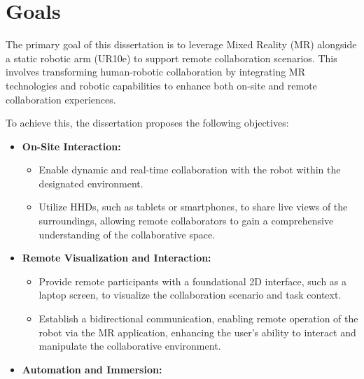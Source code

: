 \section{Goals}
\label{section:Goals}
% 
The primary goal of this dissertation is to leverage Mixed Reality (\ac{MR}) alongside a static robotic arm (UR10e) to support remote collaboration scenarios. 
This involves transforming human-robotic collaboration by integrating \ac{MR} technologies and robotic capabilities to enhance both on-site and 
remote collaboration experiences.

To achieve this, the dissertation proposes the following objectives:

\begin{itemize}
    \item \textbf{On-Site Interaction:}
    \begin{itemize}
        \item Enable dynamic and real-time collaboration with the robot within the designated environment.
        \item Utilize \ac{HHDs}, such as tablets or smartphones, to share live views of the surroundings, allowing remote collaborators 
        to gain a comprehensive understanding of the collaborative space.
    \end{itemize}
    \item \textbf{Remote Visualization and Interaction:}
    \begin{itemize}
        \item Provide remote participants with a foundational 2D interface, such as a laptop screen, to visualize the collaboration scenario and 
        task context.
        \item Establish a bidirectional communication, enabling remote operation of the robot via the \ac{MR} application, enhancing the user's ability to interact and manipulate the collaborative environment.
    \end{itemize}
    \item \textbf{Automation and Immersion:}
    \begin{itemize}

\end{itemize}
\end{itemize}

